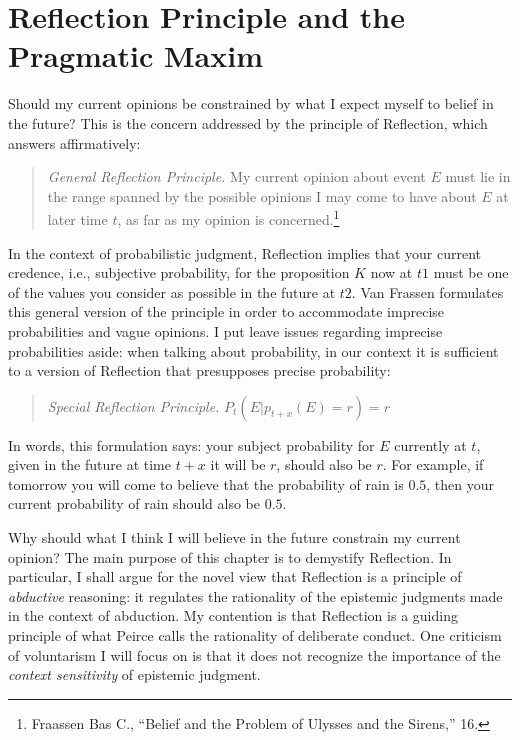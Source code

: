 
\hypertarget{reflection-principle-and-the-pragmatic-maxim}{%
\chapter{Reflection Principle and the Pragmatic
Maxim}\label{ch:reflectionmaxim}}

Should my current opinions be constrained by what I expect myself to
belief in the future? This is the concern addressed by the principle of
Reflection, which answers affirmatively:

\begin{quote}
\emph{General Reflection Principle.} My current opinion about event
\(E\) must lie in the range spanned by the possible opinions I may come
to have about \(E\) at later time \(t\), as far as my opinion is
concerned.\footnote{Fraassen Bas C., ``Belief and the Problem of Ulysses
  and the Sirens,'' 16.}
\end{quote}

In the context of probabilistic judgment, Reflection implies that your
current credence, i.e., subjective probability, for the proposition
\(K\) now at \(t1\) must be one of the values you consider as possible
in the future at \(t2\). Van Frassen formulates this general version of
the principle in order to accommodate imprecise probabilities and vague
opinions. I put leave issues regarding imprecise probabilities aside:
when talking about probability, in our context it is sufficient to a
version of Reflection that presupposes precise probability:

\begin{quote}
\emph{Special Reflection Principle.} \(P_t(E|p_{t+x} (E) = r)=r\)
\end{quote}

In words, this formulation says: your subject probability for \(E\)
currently at \(t\), given in the future at time \(t+x\) it will be
\(r\), should also be \(r\). For example, if tomorrow you will come to
believe that the probability of rain is \(0.5\), then your current
probability of rain should also be \(0.5\).

Why should what I think I will believe in the future constrain my
current opinion? The main purpose of this chapter is to demystify
Reflection. In particular, I shall argue for the novel view that
Reflection is a principle of \emph{abductive} reasoning: it regulates
the rationality of the epistemic judgments made in the context of
abduction. My contention is that Reflection is a guiding principle of
what Peirce calls the rationality of deliberate conduct. One criticism
of voluntarism I will focus on is that it does not recognize the
importance of the \emph{context sensitivity} of epistemic judgment.

